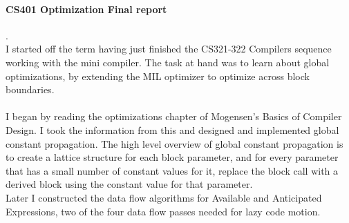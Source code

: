 \documentclass[14pt]{article}
\author{Joel Anna<annajoel@pdx.edu>}
\begin{document}
\paragraph{CS401 Optimization Final report} 
.\\
I started off the term having just finished the CS321-322 Compilers sequence working with the mini compiler. The task at hand was to learn about global optimizations, by extending the MIL optimizer to optimize across block boundaries.
\paragraph{}
I began by reading the optimizations chapter of Mogensen's Basics of Compiler Design. I took the information from this and designed and implemented global constant propagation. The high level overview of global constant propagation is to create a lattice structure for each block parameter, and for every parameter that has a small number of constant values for it, replace the block call with a derived block using the constant value for that parameter.\\ Later I constructed the data flow algorithms for Available and Anticipated Expressions, two of the four data flow passes needed for lazy code motion.
\end{document}
